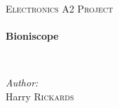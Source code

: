 \begin{titlepage}
  \begin{center}
    \null
    \vspace{0.5cm}

    \textsc{\Large Electronics A2 Project}\\[0.5cm]

    \HRule \\[0.4cm]
    { \huge \bfseries Bioniscope \\[0.4cm] }

    \HRule \\[1.5cm]

    \begin{flushright} \large
    \emph{Author:} \\
      Harry \textsc{Rickards}
    \end{flushright}

    \vfill

    \Huge{\ccLogo\, \ccAttribution\, \ccShareAlike} \\[1.5cm]

    \large \the\year
  \end{center}
\end{titlepage}
